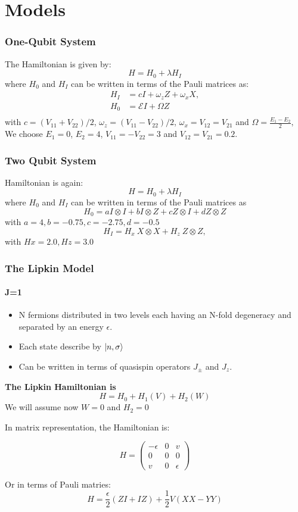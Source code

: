 \documentclass{beamer}
\begin{document}
\section{Models}

\begin{frame}[t]
	\frametitle{One-Qubit System}
The Hamiltonian is given by:
	\[ H = H_0 + \lambda H_I \] 
where $ H_0 $ and $ H_I $ can be written in terms of the Pauli matrices as:
\begin{align*}
	H_I &= cI +\omega_z Z + \omega_x X, \\
	H_0 &= \mathcal{E} I + \Omega Z \\
\end{align*}
with $c = (V_{11}+V_{22})/2$, $\omega_z = (V_{11}-V_{22})/2$, $\omega_x = V_{12}=V_{21}$ and $\Omega = \frac{E_1-E_2}{2},$
We choose $E_1=0$, 
$E_2=4$, $V_{11}=-V_{22}=3$ and $V_{12}=V_{21}=0.2$.

\end{frame}


\begin{frame}[t]
	\frametitle{Two Qubit System}
Hamiltonian is again: 
\[H = H_0 + \lambda H_I \]
where $ H_0 $ and $ H_I $ can be written in terms of the Pauli matrices as
\[H_0 = a I\otimes I + b I\otimes Z + cZ\otimes I + dZ\otimes Z\]
with $a = 4, b = -0.75, c = -2.75, d = -0.5$
\[H_I =H_x \ X \otimes X +H_z \ Z \otimes Z, \]
with $Hx = 2.0,
Hz = 3.0$
\end{frame}


\begin{frame}[t]
	\frametitle{The Lipkin Model}
	\framesubtitle{J=1}
	\begin{itemize}
		\item N fermions distributed in two levels each having an N-fold degeneracy and separated by an energy $ \epsilon $. 
		\item Each state describe by $ \ket{n, \sigma} $ 
		\item Can be written in terms of quasispin operators $ J_{\pm} $ and $ J_z $.
	\end{itemize}
	\textbf{ The Lipkin Hamiltonian is }
	\[ H = H_0 + H_1(V) + H_2(W) \] 
	We will assume now $ W = 0 $ and $ H_2 = 0 $ 
\end{frame}
\begin{frame}
	In matrix representation, the Hamiltonian is:

	\[ H = 
	\begin{pmatrix}
		-\epsilon & 0 & v \\
		0 & 0 & 0 \\
		v & 0 & \epsilon
	\end{pmatrix} 
	\]

	Or in terms of Pauli matries:
	\[H =  \frac{\epsilon}{2} (ZI + IZ) + \frac{1}{2} V (XX - YY)\]

\end{frame}
\end{document}
